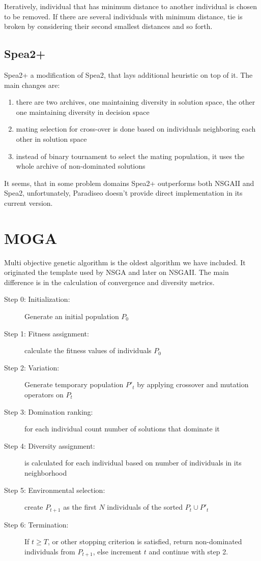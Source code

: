 \documentclass[12pt,oneside]{fithesis2}
\begin{document}
Iteratively, individual that has minimum distance to another individual is chosen to be removed. If there are several individuals with minimum distance, tie is broken by considering their second smallest distances and so forth. 

\subsection{Spea2+}
Spea2+ a modification of Spea2, that lays additional heuristic on top of it. The main changes are:
\begin{enumerate}
	\item there are two archives, one maintaining diversity in solution space, the other one maintaining diversity in decision space
	\item mating selection for cross-over is done based on individuals neighboring each other in solution space
	\item instead of binary tournament to select the mating population, it uses the whole archive of non-dominated solutions
\end{enumerate}
It seems, that in some problem domains Spea2+ outperforms both NSGAII and Spea2, unfortunately, Paradiseo doesn't provide direct implementation in its current version.

\section{MOGA}
Multi objective genetic algorithm is the oldest algorithm we have included. It originated the template used by NSGA and later on NSGAII. The main difference is in the calculation of convergence and diversity metrics.

\begin{description}
	\item[Step 0: Initialization:] Generate an initial population $P_0$ 
	\item[Step 1: Fitness assignment:] calculate the fitness values of individuals $P_0$
	\item[Step 2: Variation:] Generate temporary population $P'_t$ by applying crossover and mutation operators on $P_t$
	\item[Step 3: Domination ranking:] for each individual count number of solutions that dominate it
	\item[Step 4: Diversity assignment:] is calculated for each individual based on number of individuals in its neighborhood
	\item[Step 5: Environmental selection:] create $P_{t+1}$ as the first $N$ individuals of the sorted $P_t \cup P'_t$
	\item[Step 6: Termination:] If $t \geq T$, or other stopping criterion is satisfied, return non-dominated individuals from $P_{t+1}$, else increment $t$ and continue with step 2.
\end{description}
\end{document}
